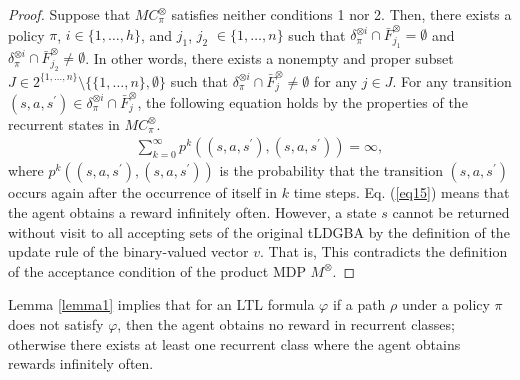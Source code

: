 \documentclass[letterpaper, 10 pt, conference]{ieeeconf}  %
\newtheorem{lemma}{Lemma}
\begin{document}
\begin{proof}
  Suppose that $MC^{\otimes}_{\pi}$ satisfies neither conditions 1 nor 2. Then, there exists a policy $\pi$, $i \in \{ 1, \ldots ,h \}$, and $j_1$, $j_2$ $\in \{ 1, \ldots ,n \}$ such that $\delta^{\otimes i}_{\pi} \cap \bar{F}^{\otimes}_{j_1} = \emptyset$ and $\delta^{\otimes i}_{\pi} \cap \bar{F}^{\otimes}_{j_2} \neq \emptyset$. In other words, there exists a nonempty and proper subset $J \in 2^{\{ 1, \ldots ,n \}} \setminus \{ \{ 1, \ldots ,n \}, \emptyset \}$ such that $ \delta^{\otimes i}_{\pi} \cap \bar{F}^{\otimes}_j \neq \emptyset $ for any $j \in J$.
   For any transition $ (s,a,s^{\prime}) \in \delta^{\otimes i}_{\pi} \cap \bar{F}^{\otimes}_j$, the following equation holds by the properties of the recurrent states in $MC^{\otimes}_{\pi}$\cite{ESS}.
  \begin{align}
    \sum_{k=0}^{\infty} p^k((s,a,s^{\prime}),(s,a,s^{\prime})) = \infty,
    \label{eq15}
  \end{align}
  where $p^k((s,a,s^{\prime}),(s,a,s^{ \prime}))$ is the probability that the transition $(s,a,s^{\prime})$ occurs again after the occurrence of itself in $k$ time steps. Eq. (\ref{eq15}) means that the agent obtains a reward infinitely often. However, a state $s$ cannot be returned without visit to all accepting sets of the original tLDGBA by the definition of the update rule of the binary-valued vector $v$. That is, This contradicts the definition of the acceptance condition of the product MDP $M^{\otimes}$.
\end{proof}

Lemma \ref{lemma1} implies that for an LTL formula $\varphi$ if a path $\rho$ under a policy $\pi$ does not satisfy $\varphi$, then the agent obtains no reward in recurrent classes; otherwise there exists at least one recurrent class where the agent obtains rewards infinitely often.

\end{document}
